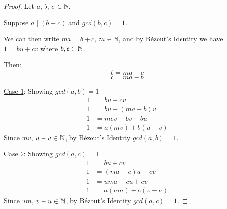 \documentclass[10pt]{article}
\begin{document}
\begin{proof}
  Let $a$, $b$, $c$ $\in \mathbb{N}$.
  \spacing

  \noindent
  Suppose $a \mid (b + c)$ and $gcd(b, c) = 1$.
  \spacing

  \noindent
  We can then write $ma = b + c$, $m \in \mathbb{N}$, and by Bézout's Identity we have $1 = bu + cv$
  where $b, c \in \mathbb{N}$.
  \spacing

  \noindent
  Then:
  $$b = ma - c$$
  $$c = ma - b$$
  \spacing

  \noindent
  \underline{Case 1}: Showing $gcd(a, b) = 1$
  \begin{align*}
    1 &= bu + cv \\
    1 &= bu + (ma - b)v \\
    1 &= mav - bv + bu \\
    1 &= a(mv) + b(u - v)
  \end{align*}
  Since $mv$, $u - v \in \mathbb{N}$, by Bézout's Identity $gcd(a, b) = 1$.
  \spacing

  \noindent
  \underline{Case 2}: Showing $gcd(a, c) = 1$
  \begin{align*}
    1 &= bu + cv \\
    1 &= (ma - c)u + cv \\
    1 &= uma - cu + cv \\
    1 &= a(um) + c(v - u)
  \end{align*}
  Since $um$, $v - u \in \mathbb{N}$, by Bézout's Identity $gcd(a, c) = 1$.
\end{proof}
\end{document}
